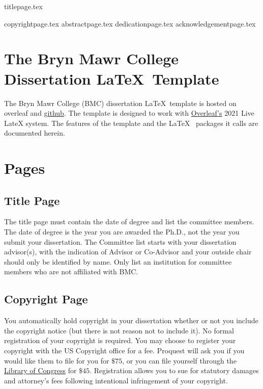 \documentclass[12pt]{report}
\begin{document}
{titlepage.tex} %

{copyrightpage.tex}
{abstractpage.tex}
\setcounter{page}{2}
{dedicationpage.tex}
{acknowledgementpage.tex}
\tableofcontents
\newpage
\listoffigures
{}
\newpage
\listoftables
{}
\newpage
\listofappendices
\newpage
\chapter{The Bryn Mawr College Dissertation \LaTeX~Template}
The Bryn Mawr College (BMC) dissertation \LaTeX~template is hosted on overleaf and \href{https://github.com/cacsphysics/BMC_Dissertation_Template}{github}. The template is designed to work with \href{https://www.overleaf.com/for/authors}{Overleaf's} 2021 Live LateX system. The features of the template and the \LaTeX~ packages it calls are documented herein.
\chapter{Pages}
\section{Title Page}
The title page must contain the date of degree and list the committee members. The date of degree is the year you are awarded the Ph.D., not the year you submit your dissertation. The Committee list starts with your dissertation advisor(s), with the indication of Advisor or Co-Advisor and your outside chair should only be identified by name. Only list an institution for committee members who are not affiliated with BMC.
\section{Copyright Page}
You automatically hold copyright in your dissertation whether or not you include the copyright notice (but there is not reason not to include it). No formal registration of your copyright is required. You may choose to register your copyright with the US Copyright office for a fee. Proquest will ask you if you would like them to file for you for $\$75$, or you can file yourself through the \href{https://www.copyright.gov/registration/}{Library of Congress} for $\$45$. Registration allows you to sue for statutory damages and attorney's fees following intentional infringement of your copyright.
\end{document}
